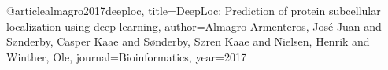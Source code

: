 @article{almagro2017deeploc,
  title={DeepLoc: Prediction of protein subcellular localization using deep learning},
  author={Almagro Armenteros, Jos{\'e} Juan and S{\o}nderby, Casper Kaae and S{\o}nderby, S{\o}ren Kaae and Nielsen, Henrik and Winther, Ole},
  journal={Bioinformatics},
  year={2017}
}
